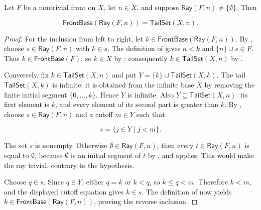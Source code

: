 \begin{helper}
Let $F$ be a nontrivial front on $X$, let $n\in X$, and suppose
$\mathsf{Ray}(F,n)\ne\{\emptyset\}$.  Then

\[
\mathsf{FrontBase}(\mathsf{Ray}(F,n))=\mathsf{TailSet}(X,n).
\]
\end{helper}
\begin{proof}
For the inclusion from left to right, let
$k\in\mathsf{FrontBase}(\mathsf{Ray}(F,n))$.  By
, choose $s\in\mathsf{Ray}(F,n)$ with $k\in s$.
The definition of  gives $n<k$ and
$\{n\}\cup s\in F$.  Thus $k\in\mathsf{FrontBase}(F)$, so
$k\in X$ by ; consequently
$k\in\mathsf{TailSet}(X,n)$ by .

Conversely, fix $k\in\mathsf{TailSet}(X,n)$ and put
$Y=\{k\}\cup\mathsf{TailSet}(X,k)$.  The tail
$\mathsf{TailSet}(X,k)$ is infinite: it is obtained from the infinite
base $X$ by removing the finite initial segment $\{0,\ldots,k\}$.  Hence
$Y$ is infinite.  Also $Y\subseteq\mathsf{TailSet}(X,n)$: its first
element is $k$, and every element of its second part is greater than $k$.
By , choose $s\in\mathsf{Ray}(F,n)$ and a cutoff
$m\in Y$ such that

\[
s=\{j\in Y\mid j<m\}.
\]

The set $s$ is nonempty.  Otherwise $\emptyset\in\mathsf{Ray}(F,n)$;
then every $t\in\mathsf{Ray}(F,n)$ is equal to $\emptyset$, because
$\emptyset$ is an initial segment of $t$ by , and
 applies.  This would make the ray trivial,
contrary to the hypothesis.

Choose $q\in s$.  Since $q\in Y$, either $q=k$ or $k<q$, so $k\le q<m$.
Therefore $k<m$, and the displayed cutoff equation gives $k\in s$.
The definition of  now yields
$k\in\mathsf{FrontBase}(\mathsf{Ray}(F,n))$, proving the reverse
inclusion.
\end{proof}
